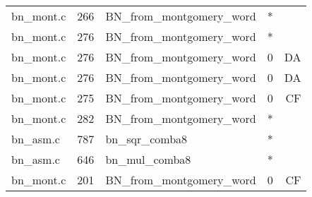 \begin{table}
\begin{tabular}{lrlrr}
bn\_mont.c& 266&BN\_from\_montgomery\_word&*&\\
bn\_mont.c& 276&BN\_from\_montgomery\_word&*&\\
bn\_mont.c& 276&BN\_from\_montgomery\_word&0 &DA\\
bn\_mont.c& 276&BN\_from\_montgomery\_word&0 &DA\\
bn\_mont.c& 275&BN\_from\_montgomery\_word&0 &CF\\
bn\_mont.c& 282&BN\_from\_montgomery\_word&*&\\
bn\_asm.c& 787&bn\_sqr\_comba8&*&\\
bn\_asm.c& 646&bn\_mul\_comba8&*&\\
bn\_mont.c& 201&BN\_from\_montgomery\_word&0 &CF\\
\hline
\end{tabular}
\renewcommand{\baselinestretch}{1.0}\selectfont
\end{table}
